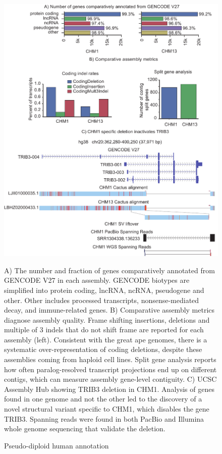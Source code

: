 \documentclass[fleqn,10pt]{wlscirep}
\begin{document}
\begin{figure}
\centering
\includegraphics[width=\textwidth,height=0.7\textheight,keepaspectratio]{figure3-human-v2.pdf}
\caption{Pseudo-diploid human annotation}
A) The number and fraction of genes comparatively annotated from GENCODE V27 in each assembly. GENCODE biotypes are simplified into protein coding, lncRNA, ncRNA, pseudogene and other. Other includes processed transcripts, nonsense-mediated decay, and immune-related genes. B) Comparative assembly metrics diagnose assembly quality. Frame shifting insertions, deletions and multiple of 3 indels that do not shift frame are reported for each assembly (left). Consistent with the great ape genomes, there is a systematic over-representation of coding deletions, despite these assemblies coming from haploid cell lines. Split gene analysis reports how often paralog-resolved transcript projections end up on different contigs, which can measure assembly gene-level contiguity. 
C) UCSC Assembly Hub\cite{nguyen2014comparative} showing TRIB3 deletion in CHM1. Analysis of genes found in one genome and not the other led to the discovery of a novel structural variant specific to CHM1, which disables the gene TRIB3. Spanning reads were found in both PacBio and Illumina whole genome sequencing that validate the deletion.
\label{fig:diploid_human}
\end{figure}
\end{document}

